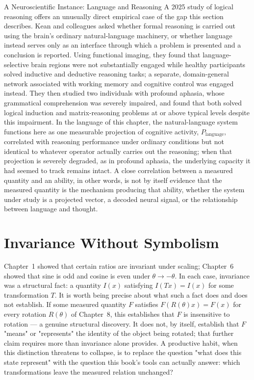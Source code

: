 \begin{sidebar}{A Neuroscientific Instance: Language and Reasoning}
A 2025 study of logical reasoning offers an unusually direct empirical
case of the gap this section describes. Kean and colleagues
\cite{kean2025} asked whether formal reasoning is carried out using the
brain's ordinary natural-language machinery, or whether language instead serves only as
an interface through which a problem is presented and a conclusion is
reported. Using functional imaging, they found that language-selective
brain regions were not substantially engaged while healthy participants
solved inductive and deductive reasoning tasks; a separate, domain-general
network associated with working memory and cognitive control was engaged
instead. They then studied two individuals with profound aphasia, whose
grammatical comprehension was severely impaired, and found that both
solved logical induction and matrix-reasoning problems at or above
typical levels despite this impairment. In the language of this chapter,
the natural-language system functions here as one measurable projection
of cognitive activity, $P_{\text{language}}$, correlated with reasoning
performance under ordinary conditions but not identical to whatever
operator actually carries out the reasoning; when that projection is
severely degraded, as in profound aphasia, the underlying capacity it had
seemed to track remains intact. A close correlation between a measured
quantity and an ability, in other words, is not by itself evidence that
the measured quantity is the mechanism producing that ability, whether
the system under study is a projected vector, a decoded neural signal, or
the relationship between language and thought.
\end{sidebar}

\section{Invariance Without Symbolism}

Chapter~1 showed that certain ratios are invariant under scaling; Chapter~6
showed that sine is odd and cosine is even under $\theta \to -\theta$. In
each case, invariance was a structural fact: a quantity $I(x)$ satisfying
$I(Tx) = I(x)$ for some transformation $T$. It is worth being precise
about what such a fact does and does not establish. If some measured
quantity $F$ satisfies $F(R(\theta)x) = F(x)$ for every rotation
$R(\theta)$ of Chapter~8, this establishes that $F$ is insensitive to
rotation --- a genuine structural discovery. It does not, by itself,
establish that $F$ "means" or "represents" the identity of the object
being rotated; that further claim requires more than invariance alone
provides. A productive habit, when this distinction threatens to
collapse, is to replace the question "what does this state represent"
with the question this book's tools can actually answer: which
transformations leave the measured relation unchanged?

